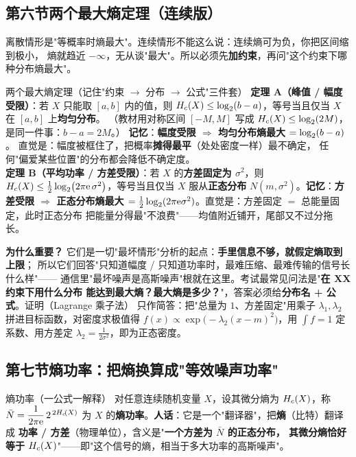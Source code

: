 \subsection{第六节\quad 两个最大熵定理（连续版）}

离散情形是"等概率时熵最大"。连续情形不能这么说：连续熵可为负，你把区间缩到极小，
熵就趋近 $-\infty$，无从谈"最大"。所以必须先\textbf{加约束}，再问"这个约束下哪种分布熵最大"。

\begin{defbox}{两个最大熵定理（记住"约束 $\to$ 分布 $\to$ 公式"三件套）}
\textbf{定理 A（峰值 / 幅度受限）}：若 $X$ 只能取 $[a,b]$ 内的值，则
$H_{c}\!\left(X\right)\le\log_{2}(b-a)$，等号当且仅当 $X$ 在 $[a,b]$ 上\textbf{均匀分布}。
（教材用对称区间 $[-M,M]$ 写成 $H_{c}\!\left(X\right)\le\log_{2}(2M)$，是同一件事：$b-a=2M$。）
\textbf{记忆}：\textbf{幅度受限 $\Rightarrow$ 均匀分布熵最大 $=\log_{2}(b-a)$}。
直觉是：幅度被框住了，把概率\textbf{摊得最平}（处处密度一样）最不确定，
任何"偏爱某些位置"的分布都会降低不确定度。\\[2pt]
\textbf{定理 B（平均功率 / 方差受限）}：若 $X$ 的\textbf{方差固定为 $\sigma^2$}，则
$H_{c}\!\left(X\right)\le\frac12\log_{2}\bigl(2\pi\mathrm{e}\,\sigma^2\bigr)$，等号当且仅当 $X$ 服从\textbf{正态分布}
$N(m,\sigma^2)$。\textbf{记忆}：\textbf{方差受限 $\Rightarrow$ 正态分布熵最大
$=\frac12\log_{2}(2\pi\mathrm{e}\sigma^2)$}。直觉是：方差固定 $=$ 总能量固定，此时正态分布
把能量分得最"不浪费"——均值附近铺开，尾部又不过分拖长。
\end{defbox}

\textbf{为什么重要？} 它们是一切"最坏情形"分析的起点：\textbf{手里信息不够，就假定熵取到上限}；
所以它们回答"只知道幅度 / 只知道功率时，最难压缩、最难传输的信号长什么样"——
通信里"最坏噪声是高斯噪声"根就在这里。考试最常见问法是"\textbf{在 XX 约束下用什么分布
能达到最大熵？最大熵是多少？}"，答案必须给\textbf{分布名 + 公式}。证明（Lagrange 乘子法）
只作简答：把"总量为 $1$、方差固定"用乘子 $\lambda_1,\lambda_2$ 拼进目标函数，对密度求极值得
$f(x)\propto\exp\bigl(-\lambda_2(x-m)^2\bigr)$，用 $\int f=1$ 定系数、用方差定
$\lambda_2=\frac{1}{2\sigma^2}$，即为正态密度。

\subsection{第七节\quad 熵功率：把熵换算成"等效噪声功率"}

\begin{defbox}{熵功率（一公式一解释）}
对任意连续随机变量 $X$，设其微分熵为 $H_{c}\!\left(X\right)$，称 $\bar N=\dfrac{1}{2\pi\mathrm{e}}\,2^{\,2H_{c}\!\left(X\right)}$
为 $X$ 的\textbf{熵功率}。\textbf{人话}：它是一个"翻译器"，把\textbf{熵}（比特）翻译成
\textbf{功率 / 方差}（物理单位），含义是"\textbf{一个方差为 $\bar N$ 的正态分布，
其微分熵恰好等于 $H_{c}\!\left(X\right)$}"——即"这个信号的熵，相当于多大功率的高斯噪声"。
\end{defbox}

